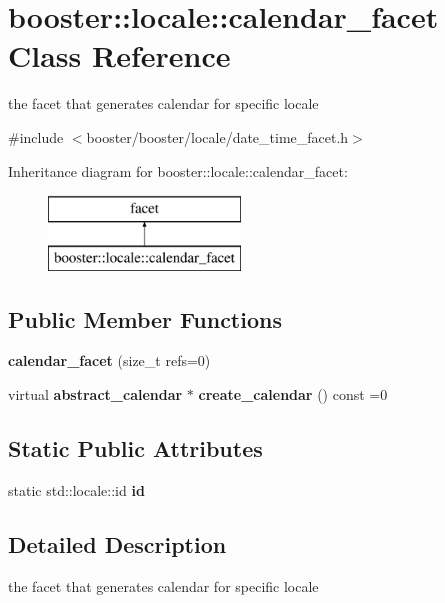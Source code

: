 \section{booster\-:\-:locale\-:\-:calendar\-\_\-facet Class Reference}
\label{classbooster_1_1locale_1_1calendar__facet}


the facet that generates calendar for specific locale  




{\ttfamily \#include $<$booster/booster/locale/date\-\_\-time\-\_\-facet.\-h$>$}

Inheritance diagram for booster\-:\-:locale\-:\-:calendar\-\_\-facet\-:\begin{figure}[H]
\begin{center}
\leavevmode
\includegraphics[height=2.000000cm]{classbooster_1_1locale_1_1calendar__facet}
\end{center}
\end{figure}
\subsection*{Public Member Functions}
\begin{DoxyCompactItemize}
\item 
{\bf calendar\-\_\-facet} (size\-\_\-t refs=0)
\item 
virtual {\bf abstract\-\_\-calendar} $\ast$ {\bf create\-\_\-calendar} () const =0
\end{DoxyCompactItemize}
\subsection*{Static Public Attributes}
\begin{DoxyCompactItemize}
\item 
static std\-::locale\-::id {\bf id}
\end{DoxyCompactItemize}


\subsection{Detailed Description}
the facet that generates calendar for specific locale 

